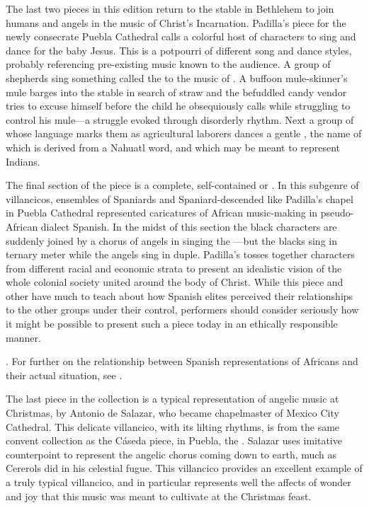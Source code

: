 The last two pieces in this edition return to the stable in Bethlehem to join humans and angels in the music of Christ's Incarnation.
Padilla's piece for the newly consecrate Puebla Cathedral calls a colorful host of characters  to sing and dance for the baby Jesus.
This  is a potpourri of different song and dance styles, probably referencing pre-existing music known to the audience.
A group of shepherds sing something called the  to the music of .
A buffoon mule-skinner's mule barges into the stable in search of straw and the befuddled candy vendor tries to excuse himself before the child he obsequiously calls  while struggling to control his mule---a struggle evoked through disorderly rhythm.
Next a group of  whose language marks them as agricultural laborers dances a gentle , the name of which is derived from a Nahuatl word, and which may be meant to represent Indians.

The final section of the piece is a complete, self-contained  or .
In this subgenre of villancicos, ensembles of Spaniards and Spaniard-descended  like Padilla's chapel in Puebla Cathedral represented caricatures of African music-making in pseudo-African dialect Spanish.
In the midst of this section the black characters are suddenly joined by a chorus of angels in singing the ---but the blacks sing in ternary meter while the angels sing in duple.
Padilla's  tosses together characters from different racial and economic strata to present an idealistic vision of the whole colonial society united around the body of Christ.
While this piece and other  have much to teach about how Spanish elites perceived their relationships to the other groups under their control, performers should consider seriously how it might be possible to present such a piece today in an ethically responsible manner.%
  \begin{Footnote}
  \autocites{Baker:EthnicVC}{Baker:PerformancePostColonial}. 
  For further on the relationship between Spanish representations of Africans and their actual situation, see \autocites{Molinero:Negros}{Lipski:AfroHispanic}{Fromont:DancingKingCongo}.
  \end{Footnote}

The last piece in the collection is a typical representation of angelic music at Christmas, by Antonio de Salazar, who became chapelmaster of Mexico City Cathedral.
This delicate villancico, with its lilting rhythms, is from the same convent collection as the Cáseda piece, in Puebla, the .
Salazar uses imitative counterpoint to represent the angelic chorus coming down to earth, much as Cererols did in his celestial fugue. 
This villancico provides an excellent example of a truly typical villancico, and in particular represents well the affects of wonder and joy that this music was meant to cultivate at the Christmas feast.

